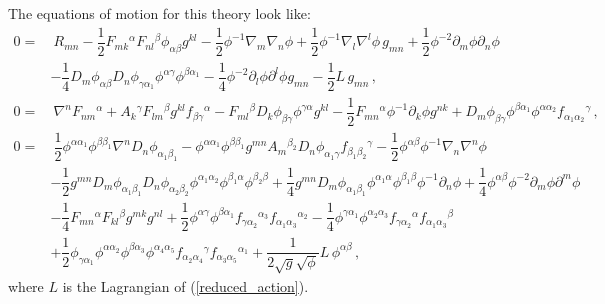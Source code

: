 \documentclass[12pt, utf8]{article}
\numberwithin{equation}{section}
\begin{document}
The equations of motion for this theory look like: 
\begin{equation}
    \begin{aligned}
     0 = &\   R_{m n} - \dfrac{1}{2} F_{m k}{}^{\alpha} F_{n l}{}^{\beta} \phi_{\alpha \beta} g^{k l} 
        - \dfrac{1}{2} \phi^{-1}  \nabla_{m} \nabla_{n} \phi 
        + \dfrac{1}{2}  \phi^{-1} \nabla_{l} \nabla^{l} \phi \, g_{m n} 
        + \dfrac{1}{2} \phi^{-2} \partial_{m} \phi \partial_{n} \phi   \\
     &   - \dfrac{1}{4} D_{m} \phi_{\alpha \beta} D_{n} \phi_{\gamma \alpha_1} \phi^{\alpha \gamma } \phi^{\beta \alpha_1} - \dfrac{1}{4} \phi^{-2} \partial_{l} \phi \partial^{l} \phi g_{m n} 
     - \dfrac{1}{2} L \, g_{m n}   \, ,  \\
     0 = &\ \nabla^{n} F_{n m}{}^{\alpha}   + A_{k}{}^{\gamma} F_{l m}{}^{\beta} g^{k l} f_{\beta \gamma}{}^{\alpha} - F_{m l}{}^{\beta} D_{k} \phi_{\beta \gamma} \phi^{\gamma \alpha} g^{k l} - \dfrac{1}{2} F_{m n}{}^{\alpha} \phi^{-1}  \partial_{k} \phi g^{n k} + D_{m} \phi_{\beta \gamma } \phi^{\beta \alpha_1} \phi^{\alpha \alpha_2} f_{\alpha_1 \alpha_2}{}^{\gamma} \, , \\
     0 = &\  \dfrac{1}{2}  \phi^{\alpha \alpha_1} \phi^{\beta \beta_1}  \nabla^{n} D_{n} \phi_{\alpha_1 \beta_1}  - \phi^{\alpha \alpha_1} \phi^{\beta \beta_1}  g^{m n}A_{m}{}^{\beta_2} D_{n} \phi_{\alpha_1 \gamma} f_{\beta_1 \beta_2 }{}^{\gamma}
     - \dfrac{1}{2} \phi^{\alpha \beta} \phi^{-1} \nabla_{n} \nabla^{n} \phi \\
     &     - \dfrac{1}{2} g^{m n} D_{m} \phi_{\alpha_1 \beta_1} D_{n} \phi_{\alpha_2 \beta_2} \phi^{\alpha_1 \alpha_2} \phi^{\beta_1 \alpha} \phi^{\beta_2 \beta}
     + \dfrac{1}{4} g^{m n} D_{m} \phi_{\alpha_1 \beta_1} \phi^{\alpha_1 \alpha} \phi^{\beta_1 \beta} \phi^{-1}\partial_{n} \phi
     + \dfrac{1}{4} \phi^{\alpha \beta} \phi^{-2} \partial_{m} \phi \partial^{m} \phi \\
    & - \dfrac{1}{4} F_{m n}{}^{\alpha} F_{k l}{}^{\beta} g^{m k} g^{n l}
     + \dfrac{1}{2} \phi^{\alpha \gamma} \phi^{\beta \alpha_1} f_{\gamma \alpha_2}{}^{\alpha_3} f_{\alpha_1 \alpha_3}{}^{\alpha_2} 
     - \dfrac{1}{4} \phi^{\gamma \alpha_1} \phi^{\alpha_2 \alpha_3} f_{\gamma \alpha_2}{}^{\alpha} f_{\alpha_1 \alpha_3}{}^{\beta} \\
    &  + \dfrac{1}{2} \phi_{\gamma \alpha_1} \phi^{\alpha \alpha_2} \phi^{\beta \alpha_3} \phi^{\alpha_4 \alpha_5} f_{\alpha_2 \alpha_4}{}^{\gamma} f_{\alpha_3 \alpha_5}{}^{\alpha_1}
     + \dfrac{1}{2\sqrt{g}\sqrt{\phi}} L \, \phi^{\alpha \beta } \, , 
\end{aligned}
\end{equation}
where $L$ is the Lagrangian of (\ref{reduced_action}).
\end{document}
